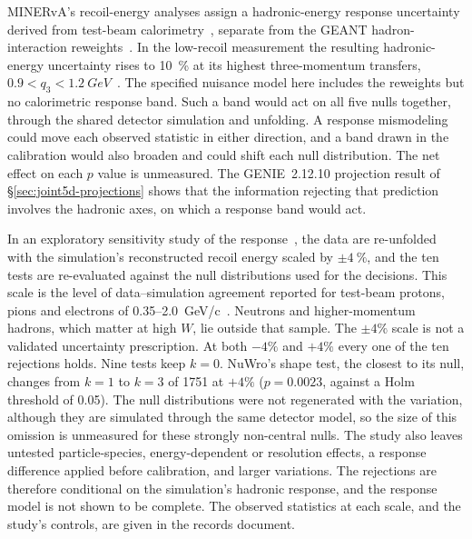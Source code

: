 MINERvA's recoil-energy analyses assign a hadronic-energy response uncertainty derived from test-beam calorimetry~\cite{MINERvA:2015testbeam}, separate from the GEANT hadron-interaction reweights~\cite{MINERvA:2021owq,MINERvA:2022incl}. In the low-recoil measurement the resulting hadronic-energy uncertainty rises to \SI{10}{\percent} at its highest three-momentum transfers, $0.9<q_{3}<\SI{1.2}{GeV}$~\cite{MINERvA:2022incl}. The specified nuisance model here includes the reweights but no calorimetric response band. Such a band would act on all five nulls together, through the shared detector simulation and unfolding. A response mismodeling could move each observed statistic in either direction, and a band drawn in the calibration would also broaden and could shift each null distribution. The net effect on each $p$ value is unmeasured. The GENIE~2.12.10 projection result of \S\ref{sec:joint5d-projections} shows that the information rejecting that prediction involves the hadronic axes, on which a response band would act.

In an exploratory sensitivity study of the response~\cite{JointTestRecoil2026}, the data are re-unfolded with the simulation's reconstructed recoil energy scaled by $\pm\SI{4}{\percent}$, and the ten tests are re-evaluated against the null distributions used for the decisions. This scale is the level of data--simulation agreement reported for test-beam protons, pions and electrons of 0.35--\SI{2.0}{GeV/c}~\cite{MINERvA:2015testbeam}. Neutrons and higher-momentum hadrons, which matter at high $W$, lie outside that sample. The $\pm4\%$ scale is not a validated uncertainty prescription. At both $-4\%$ and $+4\%$ every one of the ten rejections holds. Nine tests keep $k=0$. NuWro's shape test, the closest to its null, changes from $k=1$ to $k=3$ of 1751 at $+4\%$ ($p=0.0023$, against a Holm threshold of 0.05). The null distributions were not regenerated with the variation, although they are simulated through the same detector model, so the size of this omission is unmeasured for these strongly non-central nulls. The study also leaves untested particle-species, energy-dependent or resolution effects, a response difference applied before calibration, and larger variations. The rejections are therefore conditional on the simulation's hadronic response, and the response model is not shown to be complete. The observed statistics at each scale, and the study's controls, are given in the records document.

